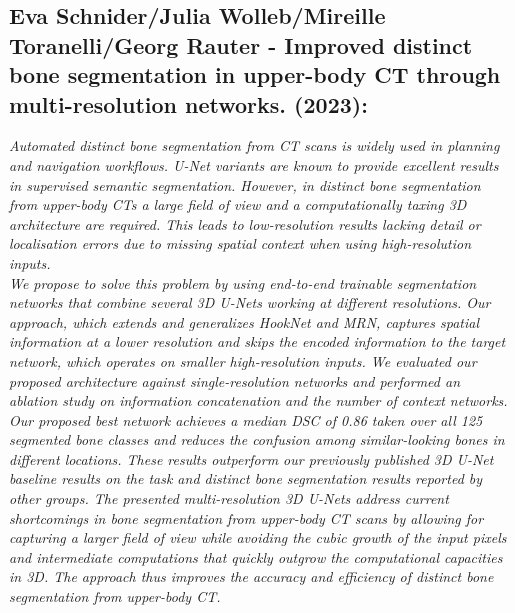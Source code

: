 \documentclass[conference]{IEEEtran}
\begin{document}
\subsection{ \textbf{Eva Schnider/Julia Wolleb/Mireille Toranelli/Georg Rauter - Improved distinct bone segmentation in upper-body CT through multi-resolution networks. (2023)}:}
\textit{Automated distinct bone segmentation from CT scans is widely used in planning and navigation workflows. U-Net variants are known to provide excellent results in supervised semantic segmentation. However, in distinct bone segmentation from upper-body CTs a large field of view and a computationally taxing 3D architecture are required. This leads to low-resolution results lacking detail or localisation errors due to missing spatial context when using high-resolution inputs.
\\We propose to solve this problem by using end-to-end trainable segmentation networks that combine several 3D U-Nets working at different resolutions. Our approach, which extends and generalizes HookNet and MRN, captures spatial information at a lower resolution and skips the encoded information to the target network, which operates on smaller high-resolution inputs. We evaluated our proposed architecture against single-resolution networks and performed an ablation study on information concatenation and the number of context networks.
\\Our proposed best network achieves a median DSC of 0.86 taken over all 125 segmented bone classes and reduces the confusion among similar-looking bones in different locations. These results outperform our previously published 3D U-Net baseline results on the task and distinct bone segmentation results reported by other groups.
The presented multi-resolution 3D U-Nets address current shortcomings in bone segmentation from upper-body CT scans by allowing for capturing a larger field of view while avoiding the cubic growth of the input pixels and intermediate computations that quickly outgrow the computational capacities in 3D. The approach thus improves the accuracy and efficiency of distinct bone segmentation from upper-body CT.}
\end{document}
